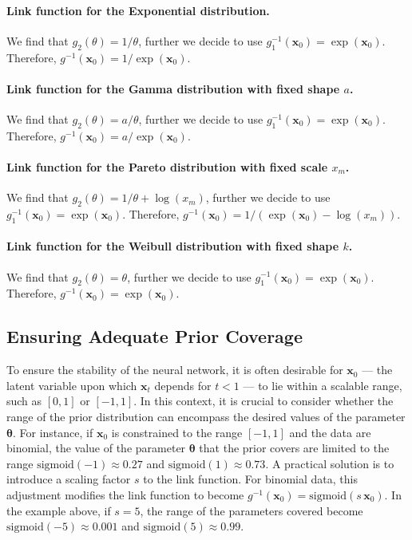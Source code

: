 \paragraph{Link function for the Exponential distribution.} We find that $g_2(\theta) = 1/\theta$, further we decide to use $g^{-1}_1(\mathbf{x}_0) = \exp(\mathbf{x}_0)$. Therefore, $g^{-1}(\mathbf{x}_0) = 1/\exp(\mathbf{x}_0)$.

\paragraph{Link function for the Gamma distribution with fixed shape $a$.} We find that $g_2(\theta) = a/\theta$, further we decide to use $g^{-1}_1(\mathbf{x}_0) = \exp(\mathbf{x}_0)$. Therefore, $g^{-1}(\mathbf{x}_0) = a/\exp(\mathbf{x}_0)$.

\paragraph{Link function for the Pareto distribution with fixed scale $x_m$.} We find that $g_2(\theta) = 1/\theta + \log(x_m)$, further we decide to use $g^{-1}_1(\mathbf{x}_0) = \exp(\mathbf{x}_0)$. Therefore, $g^{-1}(\mathbf{x}_0) = 1/(\exp(\mathbf{x}_0) - \log(x_m))$.

\paragraph{Link function for the Weibull distribution with fixed shape $k$.} We find that $g_2(\theta) = \theta$, further we decide to use $g^{-1}_1(\mathbf{x}_0) = \exp(\mathbf{x}_0)$. Therefore, $g^{-1}(\mathbf{x}_0) = \exp(\mathbf{x}_0)$.

\subsection{Ensuring Adequate Prior Coverage}
To ensure the stability of the neural network, it is often desirable for $\mathbf{x}_0$ --- the latent variable upon which $\mathbf{x}_t$ depends for $t <1$ --- to lie within a scalable range, such as $[0, 1]$ or $[-1, 1]$. In this context, it is crucial to consider whether the range of the prior distribution can encompass the desired values of the parameter $\boldsymbol{\theta}$. 
For instance, if $\mathbf{x}_0$ is constrained to the range $[-1, 1]$ and the data are binomial, the value of the parameter $\boldsymbol{\theta}$ that the prior covers are limited to the range $\text{sigmoid}(-1) \approx 0.27$ and $\text{sigmoid}(1) \approx 0.73$. 
A practical solution is to introduce a scaling factor $s$ to the link function. For binomial data, this adjustment modifies the link function to become $g^{-1}(\mathbf{x}_0) = \text{sigmoid}(s\,\mathbf{x}_0)$. In the example above, if $s=5$, the range of the parameters covered become $\text{sigmoid}(-5) \approx 0.001$ and $\text{sigmoid}(5) \approx 0.99$. 